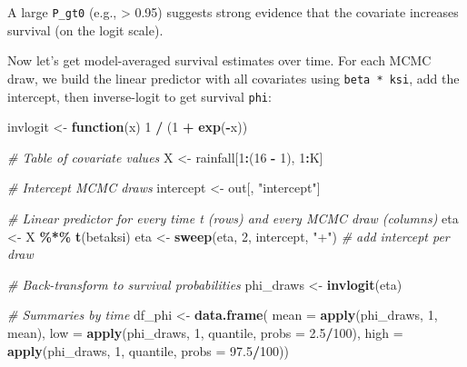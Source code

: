 \documentclass[
  12pt,
]{krantz}
\newenvironment{Shaded}{\begin{snugshade}}{\end{snugshade}}
\newcommand{\AttributeTok}[1]{\textcolor[rgb]{0.13,0.29,0.53}{#1}}
\newcommand{\CommentTok}[1]{\textcolor[rgb]{0.56,0.35,0.01}{\textit{#1}}}
\newcommand{\ControlFlowTok}[1]{\textcolor[rgb]{0.13,0.29,0.53}{\textbf{#1}}}
\newcommand{\DecValTok}[1]{\textcolor[rgb]{0.00,0.00,0.81}{#1}}
\newcommand{\FloatTok}[1]{\textcolor[rgb]{0.00,0.00,0.81}{#1}}
\newcommand{\FunctionTok}[1]{\textcolor[rgb]{0.13,0.29,0.53}{\textbf{#1}}}
\newcommand{\NormalTok}[1]{#1}
\newcommand{\OtherTok}[1]{\textcolor[rgb]{0.56,0.35,0.01}{#1}}
\newcommand{\SpecialCharTok}[1]{\textcolor[rgb]{0.81,0.36,0.00}{\textbf{#1}}}
\newcommand{\StringTok}[1]{\textcolor[rgb]{0.31,0.60,0.02}{#1}}
\begin{document}
A large \texttt{P\_gt0} (e.g., \textgreater{} 0.95) suggests strong evidence that the covariate increases survival (on the logit scale).

Now let's get model-averaged survival estimates over time. For each MCMC draw, we build the linear predictor with all covariates using \texttt{beta\ *\ ksi}, add the intercept, then inverse-logit to get survival \texttt{phi}:

\begin{Shaded}
\begin{Highlighting}[]
\NormalTok{invlogit }\OtherTok{\textless{}{-}} \ControlFlowTok{function}\NormalTok{(x) }\DecValTok{1} \SpecialCharTok{/}\NormalTok{ (}\DecValTok{1} \SpecialCharTok{+} \FunctionTok{exp}\NormalTok{(}\SpecialCharTok{{-}}\NormalTok{x))}

\CommentTok{\# Table of covariate values}
\NormalTok{X }\OtherTok{\textless{}{-}}\NormalTok{ rainfall[}\DecValTok{1}\SpecialCharTok{:}\NormalTok{(}\DecValTok{16} \SpecialCharTok{{-}} \DecValTok{1}\NormalTok{), }\DecValTok{1}\SpecialCharTok{:}\NormalTok{K]}

\CommentTok{\# Intercept MCMC draws}
\NormalTok{intercept }\OtherTok{\textless{}{-}}\NormalTok{ out[, }\StringTok{"intercept"}\NormalTok{]}

\CommentTok{\# Linear predictor for every time t (rows) and every MCMC draw (columns)}
\NormalTok{eta }\OtherTok{\textless{}{-}}\NormalTok{ X }\SpecialCharTok{\%*\%} \FunctionTok{t}\NormalTok{(betaksi) }
\NormalTok{eta }\OtherTok{\textless{}{-}} \FunctionTok{sweep}\NormalTok{(eta, }\DecValTok{2}\NormalTok{, intercept, }\StringTok{"+"}\NormalTok{)  }\CommentTok{\# add intercept per draw}

\CommentTok{\# Back{-}transform to survival probabilities}
\NormalTok{phi\_draws }\OtherTok{\textless{}{-}} \FunctionTok{invlogit}\NormalTok{(eta)}

\CommentTok{\# Summaries by time}
\NormalTok{df\_phi }\OtherTok{\textless{}{-}} \FunctionTok{data.frame}\NormalTok{(}
  \AttributeTok{mean  =} \FunctionTok{apply}\NormalTok{(phi\_draws, }\DecValTok{1}\NormalTok{, mean),}
  \AttributeTok{low  =} \FunctionTok{apply}\NormalTok{(phi\_draws, }\DecValTok{1}\NormalTok{, quantile, }\AttributeTok{probs =} \FloatTok{2.5}\SpecialCharTok{/}\DecValTok{100}\NormalTok{),}
  \AttributeTok{high  =} \FunctionTok{apply}\NormalTok{(phi\_draws, }\DecValTok{1}\NormalTok{, quantile, }\AttributeTok{probs =} \FloatTok{97.5}\SpecialCharTok{/}\DecValTok{100}\NormalTok{))}


\end{Highlighting}
\end{Shaded}
\end{document}
